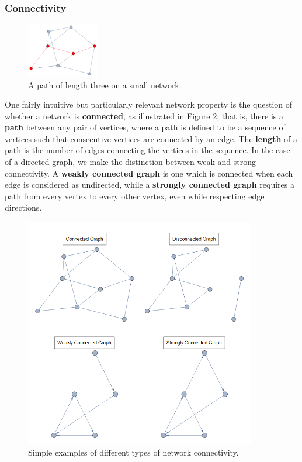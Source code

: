 \documentclass[12pt]{thesis}
\theoremstyle{plain}
\theoremstyle{definition}
\theoremstyle{remark}
\begin{document}
\subsubsection{Connectivity}

\begin{figure}
\centering
\vspace{-20pt}
\includegraphics[width=0.28\textwidth]{path_demo.png}
\caption{A path of length three on a small network.}
\vspace{-20pt}
\label{fig:path_demo}
\end{figure}

One fairly intuitive but particularly relevant network property is the question of whether a network is \textbf{connected}, as illustrated in Figure \ref{fig:connectivity_demo}; that is, there is a \textbf{path} between any pair of vertices, where a path is defined to be a sequence of vertices such that consecutive vertices are connected by an edge. The \textbf{length} of a path is the number of edges connecting the vertices in the sequence. In the case of a directed graph, we make the distinction between weak and strong connectivity. A \textbf{weakly connected graph} is one which is connected when each edge is considered as undirected, while a \textbf{strongly connected graph} requires a path from every vertex to every other vertex, even while respecting edge directions. 

\begin{figure}[t]
\centering
\includegraphics[width=0.9\textwidth]{connectivity_demo.png}
\caption{Simple examples of different types of network connectivity.}
\label{fig:connectivity_demo}
\end{figure}
\end{document}
